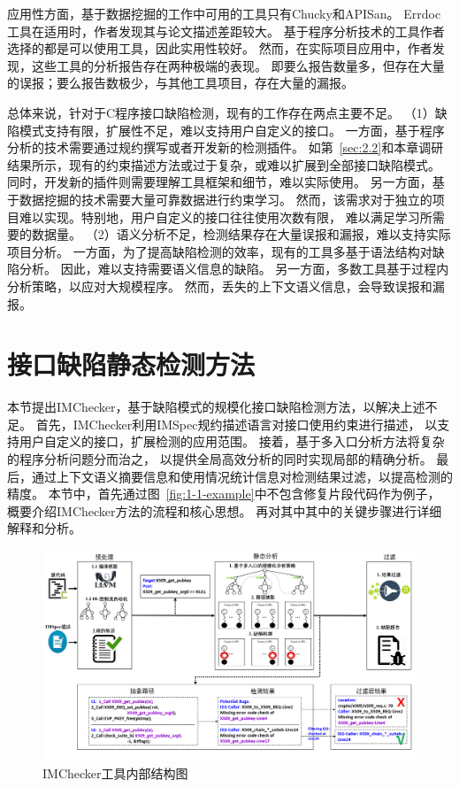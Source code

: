 应用性方面，基于数据挖掘的工作中可用的工具只有Chucky和APISan。
Errdoc工具在适用时，作者发现其与论文描述差距较大。
基于程序分析技术的工具作者选择的都是可以使用工具，因此实用性较好。
然而，在实际项目应用中，作者发现，这些工具的分析报告存在两种极端的表现。
即要么报告数量多，但存在大量的误报；要么报告数极少，与其他工具项目，存在大量的漏报。

总体来说，针对于C程序接口缺陷检测，现有的工作存在两点主要不足。
（1）缺陷模式支持有限，扩展性不足，难以支持用户自定义的接口。
一方面，基于程序分析的技术需要通过规约撰写或者开发新的检测插件。
如第~\ref{sec:2.2}和本章调研结果所示，现有的约束描述方法或过于复杂，或难以扩展到全部接口缺陷模式。
同时，开发新的插件则需要理解工具框架和细节，难以实际使用。
另一方面，基于数据挖掘的技术需要大量可靠数据进行约束学习。
然而，该需求对于独立的项目难以实现。特别地，用户自定义的接口往往使用次数有限，
难以满足学习所需要的数据量。
（2）语义分析不足，检测结果存在大量误报和漏报，难以支持实际项目分析。
一方面，为了提高缺陷检测的效率，现有的工具多基于语法结构对缺陷分析。
因此，难以支持需要语义信息的缺陷。
另一方面，多数工具基于过程内分析策略，以应对大规模程序。
然而，丢失的上下文语义信息，会导致误报和漏报。

\section{接口缺陷静态检测方法}
\label{sec:3.3}
本节提出IMChecker，基于缺陷模式的规模化接口缺陷检测方法，以解决上述不足。
首先，IMChecker利用IMSpec规约描述语言对接口使用约束进行描述，
以支持用户自定义的接口，扩展检测的应用范围。
接着，基于多入口分析方法将复杂的程序分析问题分而治之，
以提供全局高效分析的同时实现局部的精确分析。
最后，通过上下文语义摘要信息和使用情况统计信息对检测结果过滤，以提高检测的精度。
本节中，首先通过图~\ref{fig:1-1-example}中不包含修复片段代码作为例子，
概要介绍IMChecker方法的流程和核心思想。
再对其中其中的关键步骤进行详细解释和分析。

\begin{figure}[b]
	\centering
	\includegraphics[width=\linewidth]{figures/cp3-3-overview.png}
	\caption{
		IMChecker工具内部结构图
	}
	\label{fig:3-3-overview}
\end{figure}

